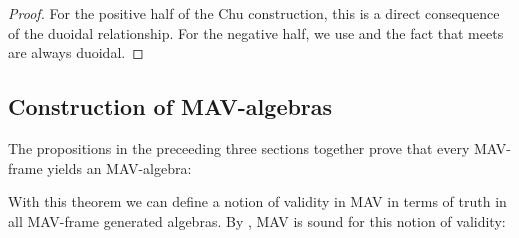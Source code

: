 \begin{proof}
  For the positive half of the Chu construction, this is a direct
  consequence of the duoidal relationship. For the negative half, we
  use  and the fact that meets are
  always duoidal.
\end{proof}

\subsection{Construction of MAV-algebras}

The propositions in the preceeding three sections together prove that
every MAV-frame yields an MAV-algebra:


With this theorem we can define a notion of validity in MAV in terms
of truth in all MAV-frame generated algebras. By , MAV is sound for this notion of validity:

